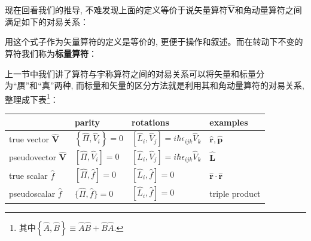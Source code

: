 现在回看我们的推导, 不难发现上面的定义等价于说矢量算符$\hat{\mathbf{V}}$和角动量算符之间满足如下的对易关系：
\begin{lequation}
    \label{eq:6.42}
\end{lequation}
用这个式子作为矢量算符的定义是等价的, 更便于操作和叙述。而在转动下不变的算符我们称为\textbf{标量算符}：
\begin{lequation}
\end{lequation}

上一节中我们讲了算符与宇称算符之间的对易关系可以将矢量和标量分为“赝”和“真”两种, 而标量和矢量的区分方法就是利用其和角动量算符的对易关系, 整理成下表\footnote{其中$\left\{\hat A,\hat B\right\}\equiv\hat A\hat B+\hat B\hat A$.}：
\begin{center}
    \begin{tabular}{llll}
        \hline \hline & parity & rotations & examples \\
        \hline true vector $\hat{\mathbf{V}}$ & $\left\{\hat{\Pi}, \hat{V}_{i}\right\}=0$ & {$\left[\hat{L}_{i}, \hat{V}_{j}\right]=i \hbar \epsilon_{i j k} \hat{V}_{k}$} & $\hat{\mathbf{r}}, \hat{\mathbf{p}}$ \\
        pseudovector $\hat{\mathbf{V}}$ & {$\left[\hat{\Pi}, \hat{V}_{i}\right]=0$} & {$\left[\hat{L}_{i}, \hat{V}_{j}\right]=i \hbar \epsilon_{i j k} \hat{V}_{k}$} & $\hat{\mathbf{L}}$ \\
        true scalar $\hat{f}$ & {$[\hat{\Pi}, \hat{f}]=0$} & {$\left[\hat{L}_{i}, \hat{f}\right]=0$} & $\hat{\mathbf{r}} \cdot \hat{\mathbf{r}}$ \\
        pseudoscalar $\hat{f}$ & $\{\hat{\Pi}, \hat{f}\}=0$ & {$\left[\hat{L}_{i}, \hat{f}\right]=0$} & triple product\\
        \hline \hline
    \end{tabular}
\end{center}

